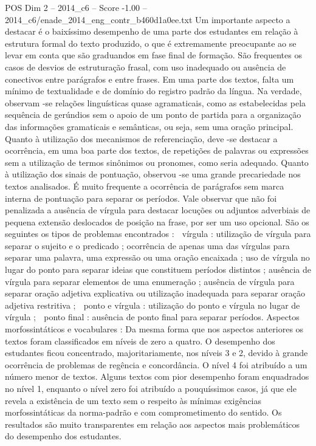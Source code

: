 \begin{textsample}{POS Dim 2 – 2014\_c6 – Score -1.00 – 2014\_c6/enade\_2014\_eng\_contr\_b460d1a0ee.txt}
Um importante aspecto a destacar é o baixíssimo desempenho de uma parte dos estudantes em relação à estrutura formal do texto produzido, o que é extremamente preocupante ao se levar em conta que são graduandos em fase final de formação.
São frequentes os casos de desvios de estruturação frasal, com uso inadequado ou ausência de conectivos entre parágrafos e entre frases.
Em uma parte dos textos, falta um mínimo de textualidade e de domínio do registro padrão da língua.
Na verdade, observam -se relações linguísticas quase agramaticais, como as estabelecidas pela sequência de gerúndios sem o apoio de um ponto de partida para a organização das informações gramaticais e semânticas, ou seja, sem uma oração principal.
Quanto à utilização dos mecanismos de referenciação, deve -se destacar a ocorrência, em uma boa parte dos textos, de repetições de palavras ou expressões sem a utilização de termos sinônimos ou pronomes, como seria adequado.
Quanto à utilização dos sinais de pontuação, observou -se uma grande precariedade nos textos analisados.
É muito frequente a ocorrência de parágrafos sem marca interna de pontuação para separar os períodos.
Vale observar que não foi penalizada a ausência de vírgula para destacar locuções ou adjuntos adverbiais de pequena extensão deslocados de posição na frase, por ser um uso opcional.
São os seguintes os tipos de problemas encontrados :  vírgula : utilização de vírgula para separar o sujeito e o predicado ; ocorrência de apenas uma das vírgulas para separar uma palavra, uma expressão ou uma oração encaixada ; uso de vírgula no lugar do ponto para separar ideias que constituem períodos distintos ; ausência de vírgula para separar elementos de uma enumeração ; ausência de vírgula para separar oração adjetiva explicativa ou utilização inadequada para separar oração adjetiva restritiva ;  ponto e vírgula : utilização do ponto e vírgula no lugar de vírgula ;  ponto final : ausência de ponto final para separar períodos.
Aspectos morfossintáticos e vocabulares : Da mesma forma que nos aspectos anteriores os textos foram classificados em níveis de zero a quatro.
O desempenho dos estudantes ficou concentrado, majoritariamente, nos níveis 3 e 2, devido à grande ocorrência de problemas de regência e concordância.
O nível 4 foi atribuído a um número menor de textos.
Alguns textos com pior desempenho foram enquadrados no nível 1, enquanto o nível zero foi atribuído a pouquíssimos casos, já que ele revela a existência de um texto sem o respeito às mínimas exigências morfossintáticas da norma-padrão e com comprometimento do sentido.
Os resultados são muito transparentes em relação aos aspectos mais problemáticos do desempenho dos estudantes.

\end{textsample}
